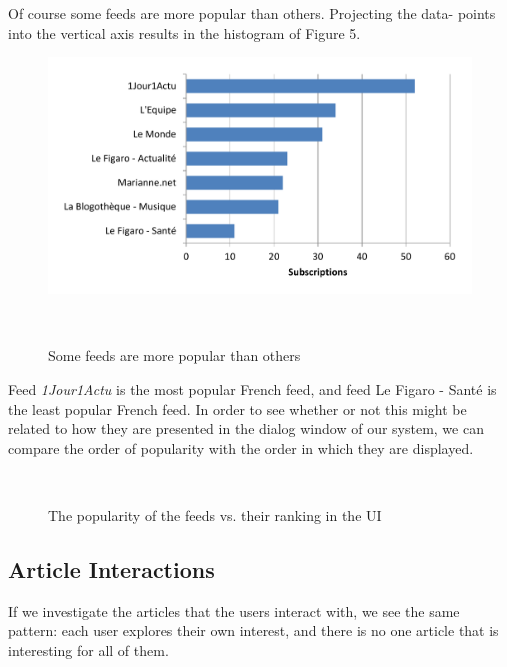 Of course some feeds are more popular than others. Projecting the data- points into the vertical axis results in the histogram of Figure 5.

\begin{figure}[h!]
\centering
  \includegraphics[width=\columnwidth]{figures/feed_popularity}
  \caption{Some feeds are more popular than others}~\label{fig:registrations}
\end{figure}


Feed {\em 1Jour1Actu} is the most popular French feed, and feed Le Figaro - Sant\'e is the least popular French feed. In order to see whether or not this might be related to how they are presented in the dialog window of our system, we can compare the order of popularity with the order in which they are displayed.

\begin{figure}[h!]
\centering
  
  \caption{The popularity of the feeds vs. their ranking in the UI}~\label{fig:registrations}
\end{figure}


\subsection{Article Interactions}
If we investigate the articles that the users interact with, we see the same pattern: each user explores their own interest, and there is no one article that is interesting for all of them. 

